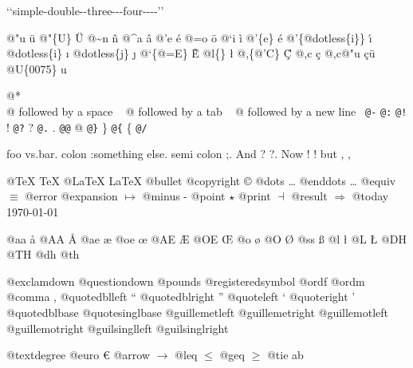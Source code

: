\documentclass{book}
\begin{document}
`\hbox{}`simple-double-\hbox{}-three{-}{-}{-}four{-}{-}{-}-'\hbox{}'\leavevmode{}\\

%
%
%
%

@"u \"{u} 
@"\{U\} \"{U} 
@\~{}n \~{n}
@\^{}a \^{a}
@'e \'{e}
@=o \={o}
@`i \`{i}
@'\{e\} \'{e}
@'\{@dotless\{i\}\} \'{\i{}} 
@dotless\{i\} \i{}
@dotless\{j\} \j{}
@`\{@=E\} \`{\={E}} 
@l\{\} \l{}
@,\{@'C\} \c{\'{C}}
@,c \c{c}
@,c@"u \c{c}\"{u} \leavevmode{}\\

@U\{0075\} u

@* \leavevmode{}\\
@ followed by a space
\ {}
@ followed by a tab
\ {}
@ followed by a new line
\ {}\texttt{@-} \-{}
\texttt{@:} \@
\texttt{@!} \@!
\texttt{@?} \@?
\texttt{@.} \@.
\texttt{@@} @
\texttt{@\}} \}
\texttt{@\{} \{
\texttt{@/} 

foo vs.\@ bar. 
colon :\@And something else.
semi colon ;\@.
And ? ?\@.
Now ! !\@@
but , ,\@

@TeX \TeX{}
@LaTeX \LaTeX{}
@bullet \textbullet{}
@copyright \copyright{}
@dots \dots{}\@
@enddots \dots{}
@equiv $\equiv{}$
@error 
@expansion $\mapsto{}$
@minus -
@point $\star{}$
@print $\dashv{}$
@result $\Rightarrow{}$
@today \today{}

@aa \aa{}
@AA \AA{}
@ae \ae{}
@oe \oe{}
@AE \AE{}
@OE \OE{}
@o \o{}
@O \O{}
@ss \ss{}
@l \l{}
@L \L{}
@DH \DH{}
@TH \TH{}
@dh \dh{}
@th \th{}

@exclamdown \textexclamdown{}
@questiondown \textquestiondown{}
@pounds \textsterling{}
@registeredsymbol \circledR{}
@ordf \textordfeminine{}
@ordm \textordmasculine{}
@comma ,
@quotedblleft \textquotedblleft{}
@quotedblright \textquotedblright{}
@quoteleft \textquoteleft{}
@quoteright \textquoteright{}
@quotedblbase \quotedblbase{}
@quotesinglbase \quotesinglbase{}
@guillemetleft \guillemotleft{}
@guillemetright \guillemotright{}
@guillemotleft \guillemotleft{}
@guillemotright \guillemotright{}
@guilsinglleft \guilsinglleft{}
@guilsinglright \guilsinglright{}

@textdegree \textdegree{}
@euro \euro{}
@arrow $\rightarrow{}$
@leq $\leq{}$
@geq $\geq{}$
@tie a\hbox{}b
\end{document}

